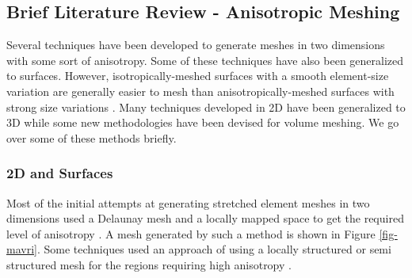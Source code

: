 \subsection{Brief Literature Review - Anisotropic Meshing}

Several techniques have been developed to generate meshes in two dimensions with some sort of anisotropy. Some of these techniques have also been generalized to surfaces. However, isotropically-meshed surfaces with a smooth element-size variation are generally easier to mesh than anisotropically-meshed surfaces with strong size variations \cite{TU2013219}. Many techniques developed in 2D have been generalized to 3D while some new methodologies have been devised for volume meshing. We go over some of these methods briefly.

\subsubsection{2D and Surfaces}

Most of the initial attempts at generating stretched element meshes in two dimensions used a Delaunay mesh and a locally mapped space to get the required level of anisotropy  \cite{mavriplis1990adaptive}. A mesh generated by such a method is shown in Figure \ref{fig-mavri}. Some techniques used an approach of using a locally structured or semi structured mesh for the regions requiring high anisotropy  \cite{nakahashi1987fdm}.

